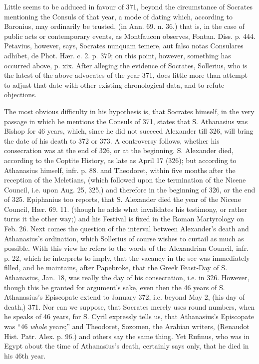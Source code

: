 Little seems to be adduced in
favour of 371, beyond the circumstance of Socrates mentioning the
Consuls of that year, a mode of dating which, according to Baronius,
may ordinarily be trusted, (in Ann. 69. n. 36.) that is, in the case
of public acts or contemporary events, as Montfaucon observes, Fontan.
Diss. p. 444. Petavius, however, says, Socrates nunquam temere, aut
falso notas Consulares adhibet, de Phot. Hær. c. 2. p. 379; on this
point, however, something has occurred above, p. xix. After alleging
the evidence of Socrates, Sollerius, who is the latest of the above
advocates of the year 371, does little more than attempt to adjust
that date with other existing chronological data, and to refute
objections.

The most obvious difficulty in
his hypothesis is, that Socrates himself, in the very passage in which
he mentions the Consuls of 371, states that S. Athanasius was Bishop
for 46 years, which, since he did not succeed Alexander till 326, will
bring the date of his death to 372 or 373. A controversy follows,
whether his consecration was at the end of 326, or at the beginning.
S. Alexander died, according to the Coptite History, as late as April
17 (326); but according to Athanasius himself, infr. p. 88. and
Theodoret, within five months after the reception of the Meletians,
(which followed upon the termination of the Nicene Council, i.e. upon
Aug. 25, 325,) and therefore in the beginning of 326, or the end of
325. Epiphanius too reports, that S. Alexander died the year of the
Nicene Council, Hær. 69. 11. (though he adds what invalidates his
testimony, or rather turns it the other way;) and his Festival is
fixed in the Roman Martyrology on Feb. 26. Next comes the
question of the interval between Alexander's death and Athanasius's
ordination, which Sollerius of course wishes to curtail as much as
possible. With this view he refers to the words of the Alexandrian
Council, infr. p. 22, which he interprets to imply, that the vacancy
in the see was immediately filled, and he maintains, after Papebroke,
that the Greek Feast-Day of S. Athanasius, Jan. 18, was really the day
of his consecration, i.e. in 326. However, though this be granted for
argument's sake, even then the 46 years of S. Athanasius's Episcopate
extend to January 372, i.e. beyond May 2, (his day of death,) 371. Nor
can we suppose, that Socrates merely uses round numbers, when he
speaks of 46 years, for S. Cyril expressly tells us, that Athanasius's
Episcopate was “46 \emph{whole} years;” and Theodoret, Sozomen,
the Arabian writers, (Renaudot Hist. Patr. Alex. p. 96.) and others
say the same thing. Yet Rufinus, who was in Egypt about the time of
Athanasius's death, certainly says only, that he died in his 46th
year.

